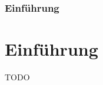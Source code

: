 
\begin{frame}

    \frametitle{Einführung}
    \section{Einführung}\label{sec:einfuhrung}


    TODO


\end{frame}
